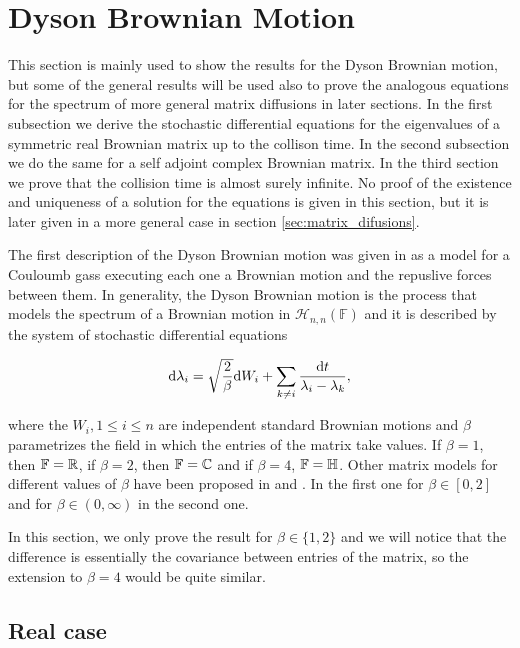 \section{Dyson Brownian Motion}

This section is mainly used to show the results for the Dyson Brownian motion, but some of the general results will be used also to prove the analogous equations for the spectrum of more general matrix diffusions in later sections. In the first subsection we derive the stochastic differential equations for the eigenvalues of a symmetric real Brownian matrix up to the collison time. In the second subsection we do the same for a self adjoint complex Brownian matrix. In the third section we prove that the collision time is almost surely infinite. No proof of the existence and uniqueness of a solution for the equations is given in this section, but it is later given in a more general case in section \ref{sec:matrix_difusions}.

The first description of the Dyson Brownian motion was given in \cite{article:dyson} as a model for a Couloumb gass executing each one a Brownian motion and the repuslive forces between them. In generality, the Dyson Brownian motion is the process that models the spectrum of a Brownian motion in $\mathcal H_{n,n}(\mathbb F)$ and it is described by the system of stochastic differential equations

\begin{equation*}
    \mathrm d \lambda_i = \sqrt{\frac{2}{\beta}}\mathrm d W_i + \sum_{k\neq i} \frac{\mathrm d t}{\lambda_i - \lambda_k},
\end{equation*}

\noindent where the $W_i, 1 \le i \le n$ are independent standard Brownian motions and $\beta$ parametrizes the field in which the entries of the matrix take values. If $\beta = 1$, then $\mathbb F = \mathbb R$, if $\beta = 2$, then $\mathbb F = \mathbb C$ and if $\beta = 4$, $\mathbb F = \mathbb H$. Other matrix models for different values of $\beta$ have been proposed in \cite{article:allez_guionnet_beta} and \cite{article:holcomb_paquette}. In the first one for $\beta \in [0,2]$ and for $\beta \in (0,\infty)$ in the second one. 

In this section, we only prove the result for $\beta \in \{1,2\}$ and we will notice that the difference is essentially the covariance between entries of the matrix, so the extension to $\beta = 4$ would be quite similar. 

\subsection{Real case}


